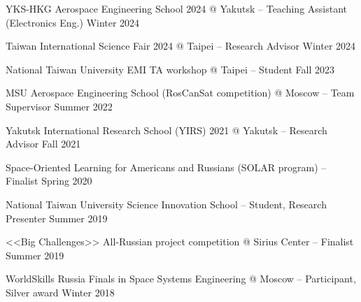 
YKS-HKG Aerospace Engineering School 2024 @ Yakutsk -- Teaching Assistant (Electronics Eng.) \hfill Winter 2024

Taiwan International Science Fair 2024 @ Taipei -- Research Advisor \hfill Winter 2024

National Taiwan University EMI TA workshop @ Taipei -- Student \hfill Fall 2023

MSU Aerospace Engineering School (RosCanSat competition) @ Moscow -- Team Supervisor \hfill Summer 2022

Yakutsk International Research School (YIRS) 2021 @ Yakutsk -- Research Advisor  \hfill Fall 2021
 
Space-Oriented Learning for Americans and Russians (SOLAR program) -- Finalist	\hfill Spring 2020

National Taiwan University Science Innovation School -- Student, Research Presenter	\hfill Summer 2019

<<Big Challenges>> All-Russian project competition @ Sirius Center -- Finalist	\hfill Summer 2019

WorldSkills Russia Finals in Space Systems Engineering @ Moscow -- Participant, Silver award	\hfill Winter 2018

